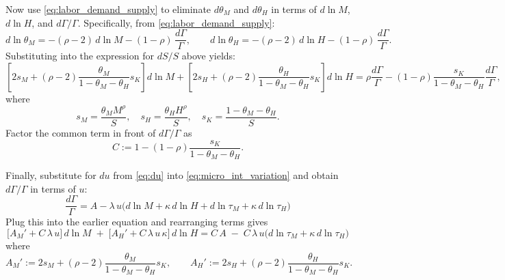 \documentclass[english]{article}
\begin{document}
Now use \eqref{eq:labor_demand_supply} to eliminate
\(d\theta_M\) and \(d\theta_H\) in terms of \(d\ln M\), \(d\ln H\), and \(d\Gamma/\Gamma\).  
Specifically, from \eqref{eq:labor_demand_supply}:
\begin{equation}
d\ln\theta_M = -(\rho-2)\,d\ln M - (1-\rho)\,\frac{d\Gamma}{\Gamma},
\qquad
d\ln\theta_H = -(\rho-2)\,d\ln H - (1-\rho)\,\frac{d\Gamma}{\Gamma}. \label{eq:d_theta}
\end{equation}
Substituting into the expression for \(dS/S\) above yields:
\[
\left[ 2s_M + (\rho-2)\frac{\theta_M}{1-\theta_M-\theta_H}s_K \right] d\ln M
+ \left[ 2s_H + (\rho-2)\frac{\theta_H}{1-\theta_M-\theta_H}s_K \right] d\ln H
= \rho\frac{d\Gamma}{\Gamma} - (1-\rho)\frac{s_K}{1-\theta_M-\theta_H} \frac{d\Gamma}{\Gamma},
\]
where 
\begin{equation}
s_M = \frac{\theta_M M^\rho}{S}, \quad
s_H = \frac{\theta_H H^\rho}{S}, \quad 
s_K = \frac{1-\theta_M-\theta_H}{S}. \label{eq:s_def}
\end{equation}
Factor the common term in front of \(d\Gamma/\Gamma\) as
\begin{equation}
C := 1 - (1-\rho)\frac{s_K}{1-\theta_M-\theta_H}. \label{eq:C_def}
\end{equation}

Finally, substitute for $du$ from \eqref{eq:du} into \eqref{eq:micro_int_variation} and obtain $d\Gamma/\Gamma$ in terms of $u$:
\[
\frac{d\Gamma}{\Gamma}
= 
A - \lambda\, u \Big(d\ln M + \kappa\,d\ln H + d\ln \tau_M + \kappa\,d\ln \tau_H\Big)
\]
Plug this into the earlier equation and rearranging terms gives
\begin{equation}
\boxed{
\big[A_M'+C\,\lambda\,u\big]\,d\ln M \;+\; \big[A_H'+C\,\lambda\,u\,\kappa\big]\,d\ln H
= C\,A \;-\; C\,\lambda\,u\Big(d\ln \tau_M + \kappa\,d\ln \tau_H\Big)}
\tag{A}\label{eq:A}
\end{equation}
where
\begin{equation}
A_M' := 2s_M + (\rho-2)\frac{\theta_M}{1-\theta_M-\theta_H}s_K,
\qquad
A_H' := 2s_H + (\rho-2)\frac{\theta_H}{1-\theta_M-\theta_H}s_K. \label{eq:Aprime_def}
\end{equation}
\end{document}

